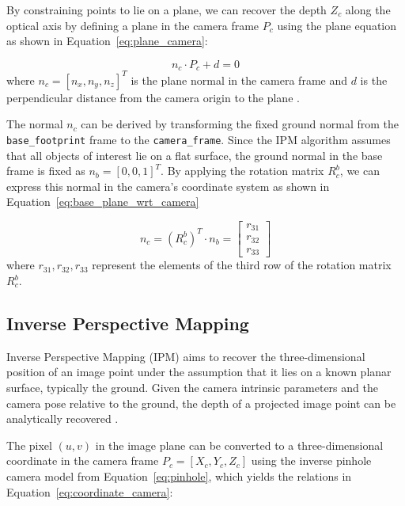 \documentclass[journal]{IAENGtran}
\begin{document}
By constraining points to lie on a plane, we can recover the depth $Z_c$ along the optical axis
by defining a plane in the camera frame $P_c$ using the plane equation as shown in Equation~\ref{eq:plane_camera}:

\begin{equation} \label{eq:plane_camera}
n_c \cdot P_c + d = 0
\end{equation}
where $n_c = [n_x, n_y, n_z]^T$ is the plane normal in the camera frame and $d$
is the perpendicular distance from the camera origin to the plane \cite{Stewart2012}.

The normal $n_c$ can be derived by transforming the fixed ground normal from the \texttt{base\_footprint}
frame to the \texttt{camera\_frame}. Since the IPM algorithm assumes that all objects of interest
lie on a flat surface, the ground normal in the base frame is fixed as $n_b = [0, 0, 1]^T$.
By applying the rotation matrix $R_{c}^{b}$, we can express this
normal in the camera's coordinate system as shown in Equation~\ref{eq:base_plane_wrt_camera}

\begin{equation} \label{eq:base_plane_wrt_camera}
n_c = (R_{c}^{b})^{T} \cdot n_b = \begin{bmatrix} r_{31} \\ r_{32} \\ r_{33} \end{bmatrix}
\end{equation}
where $r_{31}, r_{32}, r_{33}$ represent the elements of the third row of the rotation matrix $R_{c}^{b}$.

\subsection{Inverse Perspective Mapping}
Inverse Perspective Mapping (IPM) aims to recover the three-dimensional
position of an image point under the assumption that it lies on a known
planar surface, typically the ground. Given the camera intrinsic parameters
and the camera pose relative to the ground, the depth of a projected image
point can be analytically recovered \cite{Bertozzi1998,Park2023}.

The pixel $(u, v)$ in the image plane can be converted to a three-dimensional coordinate in
the camera frame $P_c = [X_c, Y_c, Z_c]$ using the inverse pinhole camera model
from Equation~\ref{eq:pinhole}, which yields the relations in Equation~\ref{eq:coordinate_camera}:
\end{document}
